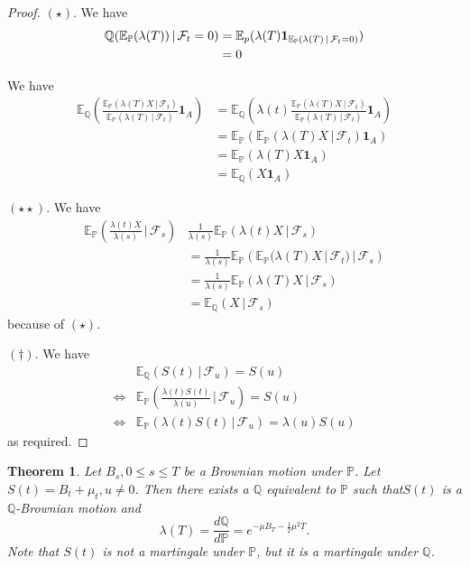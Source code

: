 \documentclass[10pt, oneside, reqno]{amsart}
\theoremstyle{plain}%
\newtheorem{thm}{Theorem}[section]
\theoremstyle{definition}
\theoremstyle{remark}
\newcommand{\given}{ \, | \,}
\newcommand{\Q}{\mathbb{Q}}
\renewcommand{\P}{\mathbb{P}}
\newcommand{\E}{\mathbb{E}}
\newcommand{\sigf}{\mathcal{F}}
\begin{document}
\begin{proof}
	$(\star)$.  We have
	\begin{align*}
		\Q(\E_\P(\lambda(T)) \given \sigf_t = 0) &= \E_p(\lambda(T) \indic{\E_\P(\lambda(T) \given \sigf_t = 0)}) \\
		&= 0
	\end{align*} 
	
	
	We have \begin{align*}
		\E_\Q \left( \frac{\E_\P(\lambda(T) X \given \sigf_t )}{\E_\P(\lambda(T) \given \sigf_t)} \mathbf{1}_A \right)  &= \E_\Q \left( \lambda(t) \frac{\E_\P(\lambda(T) X \given \sigf_t )}{\E_\P(\lambda(T) \given \sigf_t)} \mathbf{1}_A \right) \\
		&= \E_\P \left( \E_\P( \lambda(T) X \given \sigf_t) \mathbf{1}_A \right) \\
		&= \E_\P (\lambda(T) X \mathbf{1}_A) \\
		&= \E_\Q( X \mathbf{1}_A)
 	\end{align*}

	$(\star \star)$.  We have \begin{align*}
		\E_\P \left( \frac{\lambda(t) X}{\lambda(s)} \given \sigf_s \right) & \frac{1}{\lambda(s)} \E_\P(\lambda(t) X \given \sigf_s) \\
		&= \frac{1}{\lambda(s)} \E_\P\left( \E_\P(\lambda(T) X \given \sigf_t) \given \sigf_s \right) \\
		&= \frac{1}{\lambda(s)} \E_\P(\lambda(T) X \given \sigf_s) \\
		&= \E_\Q(X \given \sigf_s)
	\end{align*} because of $(\star)$.
	
	$(\dagger)$. 	 We have \begin{align*}
			&\E_\Q(S(t) \given \sigf_u) = S(u)	\\
		\iff &\E_\P \left( \frac{\lambda(t) S(t)}{\lambda(u)} \given \sigf_u \right) = S(u) \\
		\iff &\E_\P(\lambda(t) S(t) \given \sigf_u) = \lambda(u) S(u) 
	\end{align*} as required.
\end{proof}


\begin{thm}
	Let $B_s, 0 \leq s \leq T$ be a Brownian motion under $\P$.  Let $S(t) = B_t + \mu_t, u \neq 0$.  Then there exists a $\Q$ equivalent to $\P$ such that$S(t)$ is a $\Q$-Brownian motion and \[
		\lambda(T) = \frac{d\Q}{d\P} = e^{- \mu B_T - \frac{1}{2} \mu^2 T}.
	\]   Note that $S(t)$ is not a martingale under $\P$, but it is a martingale under $\Q$.
\end{thm}	
\end{document}
